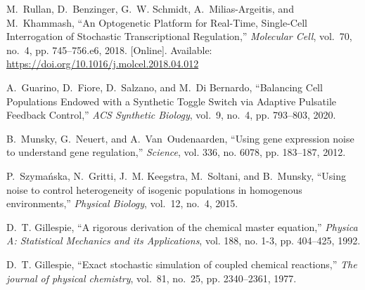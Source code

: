 \documentclass[12pt]{iopart}
\begin{document}
\begin{thebibliography}{10}
\BIBentryALTinterwordspacing
M.~Rullan, D.~Benzinger, G.~W. Schmidt, A.~Milias-Argeitis, and M.~Khammash,
  ``{An Optogenetic Platform for Real-Time, Single-Cell Interrogation of
  Stochastic Transcriptional Regulation},'' \emph{Molecular Cell}, vol.~70,
  no.~4, pp. 745--756.e6, 2018. [Online]. Available:
  \url{https://doi.org/10.1016/j.molcel.2018.04.012}
\BIBentrySTDinterwordspacing

A.~Guarino, D.~Fiore, D.~Salzano, and M.~{Di Bernardo}, ``{Balancing Cell
  Populations Endowed with a Synthetic Toggle Switch via Adaptive Pulsatile
  Feedback Control},'' \emph{ACS Synthetic Biology}, vol.~9, no.~4, pp.
  793--803, 2020.

B.~Munsky, G.~Neuert, and A.~Van~Oudenaarden, ``{Using gene expression noise to
  understand gene regulation},'' \emph{Science}, vol. 336, no. 6078, pp.
  183--187, 2012.

P.~Szyma{\'{n}}ska, N.~Gritti, J.~M. Keegstra, M.~Soltani, and B.~Munsky,
  ``{Using noise to control heterogeneity of isogenic populations in homogenous
  environments},'' \emph{Physical Biology}, vol.~12, no.~4, 2015.

D.~T. Gillespie, ``{A rigorous derivation of the chemical master equation},''
  \emph{Physica A: Statistical Mechanics and its Applications}, vol. 188, no.
  1-3, pp. 404--425, 1992.

D.~T. Gillespie, ``{Exact stochastic simulation of coupled chemical reactions},''
  \emph{The journal of physical chemistry}, vol.~81, no.~25, pp. 2340--2361,
  1977.

\end{thebibliography}
\end{document}
